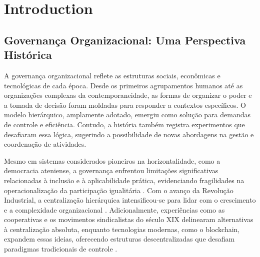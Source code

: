 
%

%

\chapter{Introduction}
\label{cha:Introduction}


\section{Governança Organizacional: Uma Perspectiva Histórica}
\label{sec:contexto_historico}

A governança organizacional reflete as estruturas sociais, econômicas e
tecnológicas de cada época. Desde os primeiros agrupamentos humanos até as
organizações complexas da contemporaneidade, as formas de organizar o poder
e a tomada de decisão foram moldadas para responder a contextos
específicos. O modelo hierárquico, amplamente adotado, emergiu como solução
para demandas de controle e eficiência. Contudo, a história também registra
experimentos que desafiaram essa lógica, sugerindo a possibilidade de novas
abordagens na gestão e coordenação de atividades.

Mesmo em sistemas considerados pioneiros na horizontalidade, como a
democracia ateniense, a governança enfrentou limitações significativas
relacionadas à inclusão e à aplicabilidade prática, evidenciando
fragilidades na operacionalização da participação igualitária
\cite{AthenianDemocracyABrief}. Com o avanço da Revolução Industrial, a
centralização hierárquica intensificou-se para lidar com o crescimento e a
complexidade organizacional \cite{WorkerCooperativesandRevolution}.
Adicionalmente, experiências como as cooperativas e os movimentos
sindicalistas do século XIX delinearam alternativas à centralização absoluta,
enquanto tecnologias modernas, como o blockchain, expandem essas ideias,
oferecendo estruturas descentralizadas que desafiam paradigmas
tradicionais de controle \cite{WorkerCooperativesinAmerica, EverydayRevolutions}.

